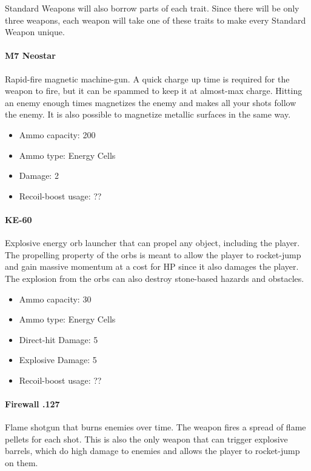 \documentclass[12pt]{article}
\begin{document}
Standard Weapons will also borrow parts of each trait. Since there will be only three weapons, each weapon will take one of these traits to make every Standard Weapon unique.

\paragraph{M7 Neostar}

Rapid-fire magnetic machine-gun. A quick charge up time is required for the weapon to fire, but it can be spammed to keep it at almost-max charge. Hitting an enemy enough times magnetizes the enemy and makes all your shots follow the enemy. It is also possible to magnetize metallic surfaces in the same way.

\begin{itemize}
	\item Ammo capacity: 200
	\item Ammo type: Energy Cells
	\item Damage: 2
	\item Recoil-boost usage: ??
\end{itemize}


\paragraph{KE-60}

Explosive energy orb launcher that can propel any object, including the player. The propelling property of the orbs is meant to allow the player to rocket-jump and gain massive momentum at a cost for HP since it also damages the player. The explosion from the orbs can also destroy stone-based hazards and obstacles. 

\begin{itemize}
	\item Ammo capacity: 30
	\item Ammo type: Energy Cells
	\item Direct-hit Damage: 5
	\item Explosive Damage: 5
	\item Recoil-boost usage: ??
\end{itemize} 


\paragraph{Firewall .127}

Flame shotgun that burns enemies over time. The weapon fires a spread of flame pellets for each shot. This is also the only weapon that can trigger explosive barrels, which do high damage to enemies and allows the player to rocket-jump on them. 
\end{document}
